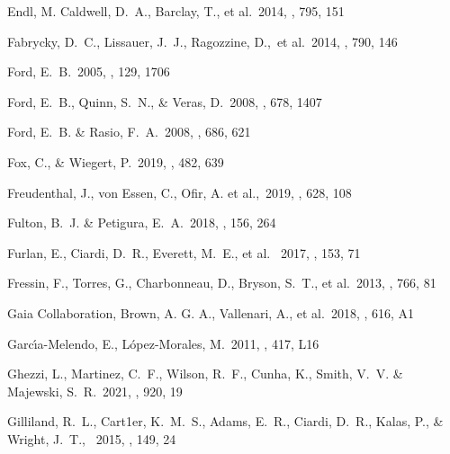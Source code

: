 \documentclass{aastex62}
\begin{document}
\begin{thebibliography}{}
Endl, M.  Caldwell, D.~A.,  Barclay, T., et al.~2014, \apj, 795, 151

 Fabrycky, D.~C., Lissauer, J.~J., Ragozzine, D.,~et al.~2014, \apj, 790, 146 

 Ford, E.~B.~2005, \aj, 129, 1706

 Ford, E.~B., Quinn, S.~N., \& Veras, D.\ 2008, \apj, 678, 1407 %

 Ford, E.~B. \& Rasio, F.~A.\ 2008, \apj, 686, 621 %

 Fox, C., \& Wiegert, P.~2019, \mnras, 482, 639 

 Freudenthal, J., von Essen, C., Ofir, A. et al.,~2019, \aap, 628, 108

 Fulton, B.~J. \& Petigura, E.~A.~2018, \aj, 156, 264

Furlan, E., Ciardi, D.~R., Everett, M.~E., et al.~ 2017, \aj, 153, 71


 
 Fressin, F., Torres, G., Charbonneau, D., Bryson, S.~T., et al.\ 2013, \apj, 766, 81

Gaia Collaboration, Brown, A. G. A., Vallenari, A., et al.~2018,
\aap, 616, A1%

 Garc{\'\i}a-Melendo, E., L{\'o}pez-Morales, M.~2011, \mnras, 417, L16

 Ghezzi, L., Martinez, C.~F., Wilson, R.~F.,  Cunha, K., Smith, V.~V. \& Majewski, S.~R.~2021, \apj, 920, 19

 Gilliland, R.~L., Cart1er, K.~M.~S., Adams, E.~R.,  Ciardi, D.~R., Kalas, P., \&  Wright, J.~T., ~2015, \aj, 149, 24


\end{thebibliography}
\end{document}
